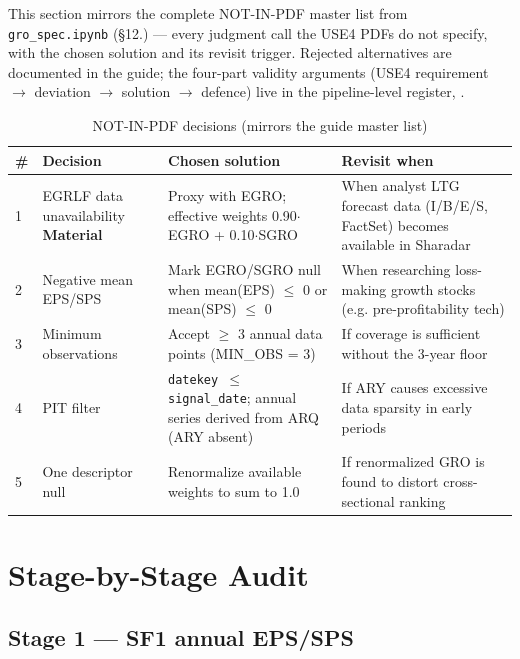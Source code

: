 \documentclass[11pt,a4paper]{article}
\newcommand{\WARN}[1]{\textcolor{warn}{\textbf{#1}}}
\begin{document}
This section mirrors the complete NOT-IN-PDF master list from
\texttt{gro\_spec.ipynb} (\S12.) --- every judgment call the USE4 PDFs do not
specify, with the chosen solution and its revisit trigger. Rejected alternatives
are documented in the guide; the four-part validity arguments (USE4 requirement
$\to$ deviation $\to$ solution $\to$ defence) live in the pipeline-level
register, .

\begin{longtable}{@{}p{0.5cm}p{3.6cm}p{6.0cm}p{3.8cm}@{}}
\caption{NOT-IN-PDF decisions (mirrors the guide master list)}\\
\toprule
\textbf{\#} & \textbf{Decision} & \textbf{Chosen solution} & \textbf{Revisit when} \\
\midrule
\endhead
1 & EGRLF data unavailability \WARN{Material} & Proxy with EGRO; effective weights 0.90$\cdot$EGRO + 0.10$\cdot$SGRO & When analyst LTG forecast data (I/B/E/S, FactSet) becomes available in Sharadar \\[3pt]
2 & Negative mean EPS/SPS & Mark EGRO/SGRO null when mean(EPS) $\leq$ 0 or mean(SPS) $\leq$ 0 & When researching loss-making growth stocks (e.g. pre-profitability tech) \\[3pt]
3 & Minimum observations & Accept $\geq$ 3 annual data points (MIN\_OBS = 3) & If coverage is sufficient without the 3-year floor \\[3pt]
4 & PIT filter & \texttt{datekey $\leq$ signal\_date}; annual series derived from ARQ (ARY absent) & If ARY causes excessive data sparsity in early periods \\[3pt]
5 & One descriptor null & Renormalize available weights to sum to 1.0 & If renormalized GRO is found to distort cross-sectional ranking \\[3pt]
\bottomrule
\end{longtable}

\section{Stage-by-Stage Audit}

\subsection{Stage 1 --- SF1 annual EPS/SPS}
\end{document}
